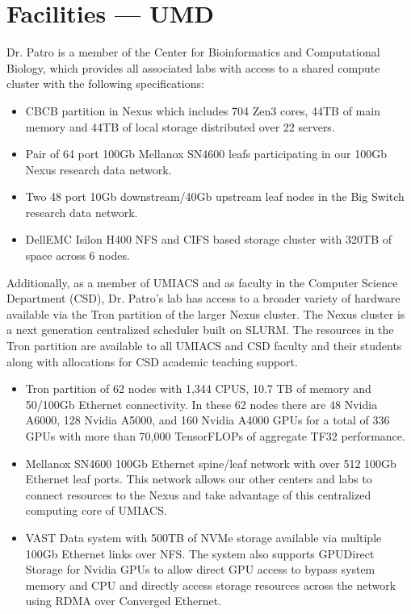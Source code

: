 
\section*{Facilities ---  UMD}

Dr. Patro is a member of the Center for Bioinformatics and Computational Biology, which provides all associated labs with access to a shared compute cluster with the following specifications:

\begin{itemize}
\item CBCB partition in Nexus which includes 704 Zen3 cores, 44TB of main memory and 44TB of local storage distributed over 22 servers.
\item Pair of 64 port 100Gb Mellanox SN4600 leafs participating in our 100Gb Nexus research data network. 
\item Two 48 port 10Gb downstream/40Gb upstream leaf nodes in the Big Switch research data network.
\item DellEMC Isilon H400 NFS and CIFS based storage cluster with 320TB of space across 6 nodes.
\end{itemize}

Additionally, as a member of UMIACS and as faculty in the Computer Science Department (CSD), Dr. Patro’s lab has access to a broader variety of hardware available via the Tron partition of the larger Nexus cluster. The Nexus cluster is a next generation centralized scheduler built on SLURM. The resources in the Tron partition are available to all UMIACS and CSD faculty and their students along with allocations for CSD academic teaching support.

\begin{itemize}
\item Tron partition of 62 nodes with 1,344 CPUS, 10.7 TB of memory and 50/100Gb Ethernet connectivity.  In these 62 nodes there are 48 Nvidia A6000, 128 Nvidia A5000, and 160 Nvidia A4000 GPUs for a total of 336 GPUs with more than 70,000 TensorFLOPs of aggregate TF32 performance.  
\item Mellanox SN4600 100Gb Ethernet spine/leaf network with over 512 100Gb Ethernet leaf ports.  This network allows our other centers and labs to connect resources to the Nexus and take advantage of this centralized computing core of UMIACS.
\item VAST Data system with 500TB of NVMe storage available via multiple 100Gb Ethernet links over NFS.  The system also supports GPUDirect Storage for Nvidia GPUs to allow direct GPU access to bypass system memory and CPU and directly access storage resources across the network using RDMA over Converged Ethernet.
\end{itemize}

